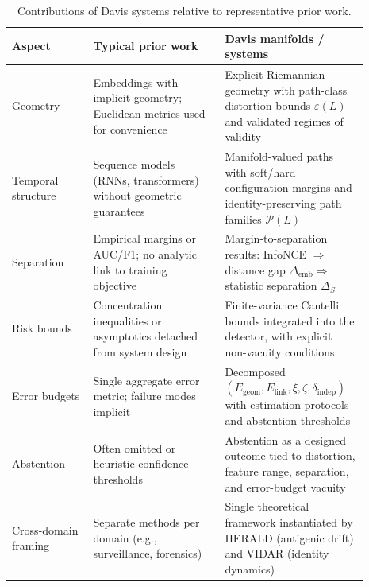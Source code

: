 \documentclass[11pt]{article}
\begin{document}
\begin{samepage}
\begin{table}[H]
    \centering
    \caption{Contributions of Davis systems relative to representative prior work.}
    \label{tab:contrib-vs-prior}
    \begin{tabularx}{\linewidth}{@{}p{0.21\linewidth}p{0.34\linewidth}p{0.34\linewidth}@{}}
        \toprule
        \textbf{Aspect} & \textbf{Typical prior work} & \textbf{Davis manifolds / systems} \\
        \midrule
        Geometry & Embeddings with implicit geometry; Euclidean metrics used for convenience & Explicit Riemannian geometry with path-class distortion bounds $\varepsilon(L)$ and validated regimes of validity \\
        \addlinespace[2pt]
        Temporal structure & Sequence models (RNNs, transformers) without geometric guarantees & Manifold-valued paths with soft/hard configuration margins and identity-preserving path families $\mathcal{P}(L)$ \\
        \addlinespace[2pt]
        Separation & Empirical margins or AUC/F1; no analytic link to training objective & Margin-to-separation results: InfoNCE $\Rightarrow$ distance gap $\Delta_{\text{emb}} \Rightarrow$ statistic separation $\Delta_S$ \\
        \addlinespace[2pt]
        Risk bounds & Concentration inequalities or asymptotics detached from system design & Finite-variance Cantelli bounds integrated into the detector, with explicit non-vacuity conditions \\
        \addlinespace[2pt]
        Error budgets & Single aggregate error metric; failure modes implicit & Decomposed $(E_{\text{geom}}, E_{\text{link}}, \xi, \zeta, \delta_{\text{indep}})$ with estimation protocols and abstention thresholds \\
        \addlinespace[2pt]
        Abstention & Often omitted or heuristic confidence thresholds & Abstention as a designed outcome tied to distortion, feature range, separation, and error-budget vacuity \\
        \addlinespace[2pt]
        Cross-domain framing & Separate methods per domain (e.g., surveillance, forensics) & Single theoretical framework instantiated by HERALD (antigenic drift) and VIDAR (identity dynamics) \\
        \bottomrule
    \end{tabularx}
\end{table}
\end{samepage}
\end{document}
